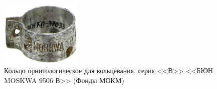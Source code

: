 \begin{figure}

    \begin{center}
    \includegraphics[width=0.35\textwidth]{authors/usupova-fig-3.jpg}
  \end{center}
  \caption{Кольцо орнитологическое для кольцевания, серия <<В>> <<БЮН MOSKWA 9506 В>> (Фонды МОКМ)}
  \label{fig:usupova-fig-3}
\vspace{-14pt}
\end{figure}

